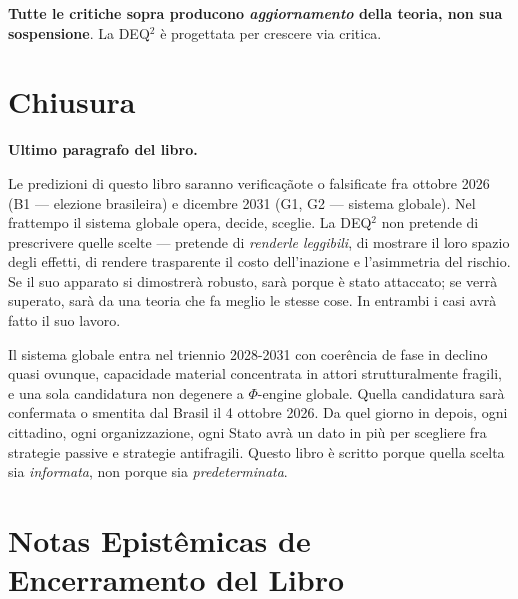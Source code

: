 \Proved{} \textbf{Tutte le critiche sopra producono \emph{aggiornamento}
della teoria, non sua sospensione}. La DEQ$^2$ è progettata per crescere
via critica.



\section{Chiusura}\label{chiusura}

\Hypoth{} \textbf{Ultimo paragrafo del libro.}

Le predizioni di questo libro saranno verificaçãote o falsificate fra
ottobre 2026 (B1 --- elezione brasileira) e dicembre 2031 (G1, G2 ---
sistema globale). Nel frattempo il sistema globale opera, decide,
sceglie. La DEQ$^2$ non pretende di prescrivere quelle scelte --- pretende
di \emph{renderle leggibili}, di mostrare il loro spazio degli effetti,
di rendere trasparente il costo dell'inazione e l'asimmetria del
rischio. Se il suo apparato si dimostrerà robusto, sarà porque è stato
attaccato; se verrà superato, sarà da una teoria che fa meglio le stesse
cose. In entrambi i casi avrà fatto il suo lavoro.

Il sistema globale entra nel triennio 2028-2031 con coerência de fase in
declino quasi ovunque, capacidade material concentrata in attori
strutturalmente fragili, e una sola candidatura non degenere a
\(\Phi\)-engine globale. Quella candidatura sarà confermata o smentita
dal Brasil il 4 ottobre 2026. Da quel giorno in depois, ogni cittadino,
ogni organizzazione, ogni Stato avrà un dato in più per scegliere fra
strategie passive e strategie antifragili. Questo libro è scritto porque
quella scelta sia \emph{informata}, non porque sia
\emph{predeterminata}.



\section{Notas Epistêmicas de Encerramento del
Libro}\label{note-epistemiche-di-chiusura-del-libro}

